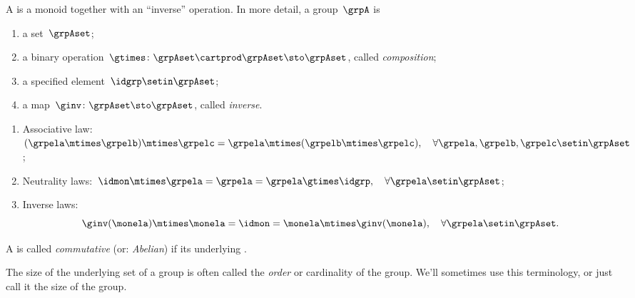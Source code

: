 \begin{ctdefinition}[Group]
    \label{def:group}
    A \emph{} is a monoid together with an ``inverse'' operation.
    In more detail, a group~$\grpA$ is
    \begin{body}
        \constit
        \begin{enumerate}
            \item a set~$\grpAset$;
            \item a binary operation~$\gtimes \colon \grpAset \cartprod \grpAset \sto \grpAset$, called \emph{composition};
            \item a specified element~$\idgrp \setin \grpAset$;
            \item a map~$\ginv\colon \grpAset \sto \grpAset$, called \emph{inverse}.
        \end{enumerate}
        \condit
        \begin{enumerate}
            \item Associative law:~$(\grpela\mtimes \grpelb)\mtimes \grpelc=\grpela\mtimes (\grpelb\mtimes \grpelc), \quad \forall  \grpela, \grpelb, \grpelc \setin \grpAset$;
            \item Neutrality laws:~$\idmon\mtimes \grpela=\grpela=\grpela \gtimes \idgrp, \quad \forall  \grpela \setin \grpAset$;
            \item Inverse laws:
                  \begin{equation}
                      \label{eq:group-inverse-law}
                      \ginv(\monela) \mtimes \monela = \idmon = \monela \mtimes \ginv(\monela), \quad \forall  \grpela  \setin \grpAset.
                  \end{equation}
        \end{enumerate}
    \end{body}
\end{ctdefinition}

\begin{ctdefinition}\label{def:commutative-group}
    A  is called \emph{commutative} (or: \emph{Abelian}) if its underlying .
\end{ctdefinition}

\begin{remark}
    The size of the underlying set of a group is often called the \emph{order} or cardinality of the group.
    We'll sometimes use this terminology, or just call it the size of the group.
\end{remark}


